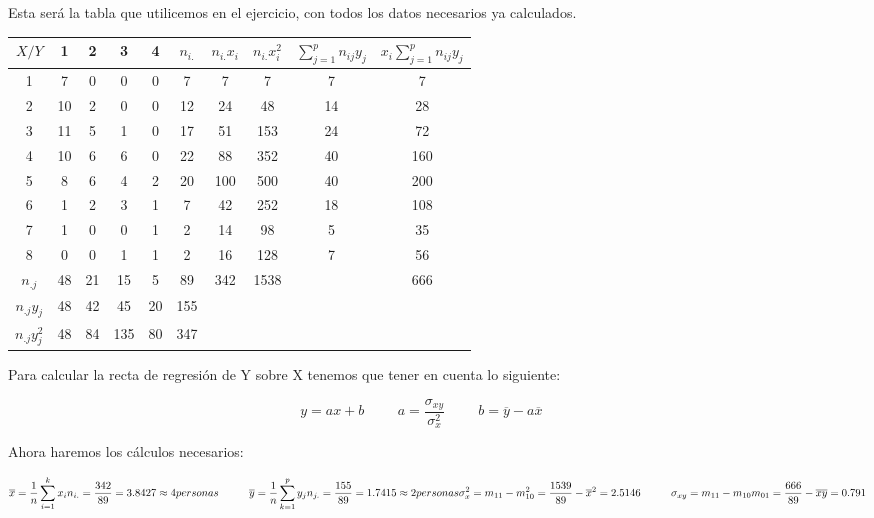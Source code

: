 \subproblem
Esta será la tabla que utilicemos en el ejercicio, con todos los datos necesarios ya calculados.

\begin{table}[ht]
    \begin{tabular}{|c|c|c|c|c|c|c|c|c|c|}
        \hline
         $X/Y$ & 1 & 2 & 3 & 4 & $n_{i.}$ & $n_{i.} x_i$ & $n_{i.} x_i^2$ & $\sum_{j=1}^p n_{ij} y_j$ & $x_i \sum_{j=1}^p n_{ij} y_j$ \\ \hline
         1 & 7 & 0 & 0 & 0 & 7 & 7 & 7 & 7 & 7 \\ \hline 
         2 & 10 & 2 & 0 & 0 & 12 & 24 & 48 & 14 & 28 \\ \hline 
         3 & 11 & 5 & 1 & 0 & 17 & 51 & 153 & 24 & 72 \\ \hline 
         4 & 10 & 6 & 6 & 0 & 22 & 88 & 352 & 40 & 160 \\ \hline 
         5 & 8 & 6 & 4 & 2 & 20 & 100 & 500 & 40 & 200 \\ \hline 
         6 & 1 & 2 & 3 & 1 & 7 & 42 & 252 & 18 & 108 \\ \hline 
         7 & 1 & 0 & 0 & 1 & 2 & 14 & 98 & 5 & 35 \\ \hline
         8 & 0 & 0 & 1 & 1 & 2 & 16 & 128 & 7 & 56 \\ \hline
         $n_{.j}$ & 48 & 21 & 15 & 5 & 89 & 342 & 1538 &  & 666 \\ \hline
         $n_{.j}y_j$ & 48 & 42 & 45 & 20 & 155 &  &  &  &  \\ \hline
         $n_{.j}y_j^2$ & 48 & 84 & 135 & 80 & 347 &  &  &  &  \\ \hline
    \end{tabular}
\end{table}

Para calcular la recta de regresión de Y sobre X tenemos que tener en cuenta lo siguiente:

\begin{equation*}
    y = ax+b
    \hspace{1cm}
    a = \dfrac{\sigma_{xy}}{\sigma_x^2}
    \hspace{1cm}
    b = \overline{y} - a \overline{x}
    \hspace{1cm}
\end{equation*}

Ahora haremos los cálculos necesarios:

\begin{center}
    \begin{equation*}
        \overline{x} = \dfrac{1}{n} \sum_{i=1}^k x_i n_{i.} = \dfrac{342}{89} = 3.8427 \approx 4 personas
        \hspace{1cm}
        \overline{y} = \dfrac{1}{n} \sum_{k=1}^p y_j n_{j.} = \dfrac{155}{89} = 1.7415 \approx 2 personas\\
        
        \sigma_{x}^2 = m_{11} - m_{10}^2 = \dfrac{1539}{89} - \overline{x}^2 = 2.5146
        \hspace{1cm}
        \sigma_{xy} = m_{11} - m_{10}m_{01} = \dfrac{666}{89} - \overline{x}\overline{y} = 0.791
    \end{equation*}
\end{center}

